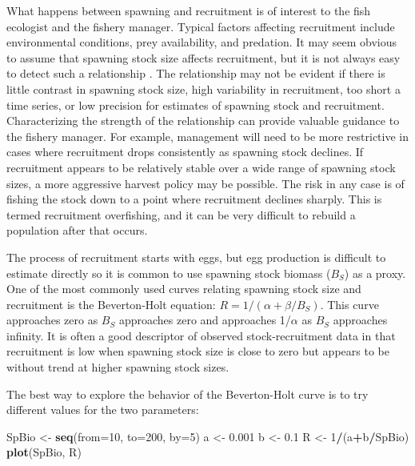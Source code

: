 \documentclass[
]{krantz}
\makeatletter
\newenvironment{Shaded}{\begin{snugshade}}{\end{snugshade}}
\newcommand{\AttributeTok}[1]{\textcolor[rgb]{0.27,0.27,0.27}{#1}}
\newcommand{\DecValTok}[1]{\textcolor[rgb]{0.06,0.06,0.06}{#1}}
\newcommand{\FloatTok}[1]{\textcolor[rgb]{0.06,0.06,0.06}{#1}}
\newcommand{\FunctionTok}[1]{\textcolor[rgb]{0.27,0.27,0.27}{\textbf{#1}}}
\newcommand{\NormalTok}[1]{#1}
\newcommand{\OtherTok}[1]{\textcolor[rgb]{0.37,0.37,0.37}{#1}}
\newcommand{\SpecialCharTok}[1]{\textcolor[rgb]{0.43,0.43,0.43}{\textbf{#1}}}
\newenvironment{kframe}{%
\medskip{}
\setlength{\fboxsep}{.8em}
 \def\at@end@of@kframe{}%
 \ifinner\ifhmode%
  \def\at@end@of@kframe{\end{minipage}}%
  \begin{minipage}{\columnwidth}%
 \fi\fi%
 \def\FrameCommand##1{\hskip\@totalleftmargin \hskip-\fboxsep
 \colorbox{shadecolor}{##1}\hskip-\fboxsep
     \hskip-\linewidth \hskip-\@totalleftmargin \hskip\columnwidth}%
 \MakeFramed {\advance\hsize-\width
   \@totalleftmargin\z@ \linewidth\hsize
   \@setminipage}}%
 {\par\unskip\endMakeFramed%
 \at@end@of@kframe}
\renewenvironment{Shaded}{\begin{kframe}}{\end{kframe}}
\makeatother
\begin{document}
What happens between spawning and recruitment is of interest to the fish ecologist and the fishery manager. Typical factors affecting recruitment include environmental conditions, prey availability, and predation. It may seem obvious to assume that spawning stock size affects recruitment, but it is not always easy to detect such a relationship \citep{hilborn.walters_1992}. The relationship may not be evident if there is little contrast in spawning stock size, high variability in recruitment, too short a time series, or low precision for estimates of spawning stock and recruitment. Characterizing the strength of the relationship can provide valuable guidance to the fishery manager. For example, management will need to be more restrictive in cases where recruitment drops consistently as spawning stock declines. If recruitment appears to be relatively stable over a wide range of spawning stock sizes, a more aggressive harvest policy may be possible. The risk in any case is of fishing the stock down to a point where recruitment declines sharply. This is termed recruitment overfishing, and it can be very difficult to rebuild a population after that occurs.

The process of recruitment starts with eggs, but egg production is difficult to estimate directly so it is common to use spawning stock biomass (\(B_S\)) as a proxy. One of the most commonly used curves relating spawning stock size and recruitment is the Beverton-Holt equation: \(R=1/(\alpha +\beta/B_S)\). This curve approaches zero as \(B_S\) approaches zero and approaches 1/\(\alpha\) as \(B_S\) approaches infinity. It is often a good descriptor of observed stock-recruitment data in that recruitment is low when spawning stock size is close to zero but appears to be without trend at higher spawning stock sizes.

The best way to explore the behavior of the Beverton-Holt curve is to try different values for the two parameters:

\begin{Shaded}
\begin{Highlighting}[]
\NormalTok{SpBio }\OtherTok{\textless{}{-}} \FunctionTok{seq}\NormalTok{(}\AttributeTok{from=}\DecValTok{10}\NormalTok{, }\AttributeTok{to=}\DecValTok{200}\NormalTok{, }\AttributeTok{by=}\DecValTok{5}\NormalTok{)}
\NormalTok{a }\OtherTok{\textless{}{-}} \FloatTok{0.001}
\NormalTok{b }\OtherTok{\textless{}{-}} \FloatTok{0.1}
\NormalTok{R }\OtherTok{\textless{}{-}} \DecValTok{1}\SpecialCharTok{/}\NormalTok{(a}\SpecialCharTok{+}\NormalTok{b}\SpecialCharTok{/}\NormalTok{SpBio)}
\FunctionTok{plot}\NormalTok{(SpBio, R)}
\end{Highlighting}
\end{Shaded}
\end{document}
